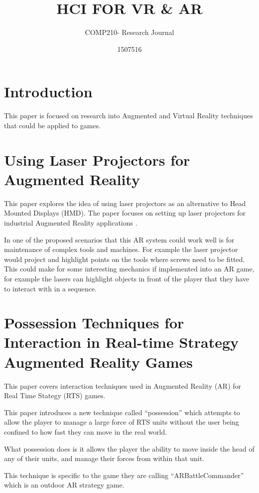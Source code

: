 \documentclass{scrartcl}
\title{HCI FOR VR \& AR}
\subtitle{COMP210- Research Journal}
\author{1507516}
\begin{document}
\maketitle

\abstract{}


\section{Introduction}
This paper is focused on research into Augmented and Virtual Reality techniques that could be applied to games.

\cite{nielsen1990heuristic}

\section {Using Laser Projectors for Augmented Reality\cite{Schwerdtfeger:2008}}

This paper explores the idea of using laser projectors as an alternative to Head Mounted Displays (HMD).
The paper focuses on setting up laser projectors for industrial Augmented Reality applications \cite{Schwerdtfeger:2008}.

In one of the proposed scenarios that this AR system could work well is for maintenance of complex tools and machines. For example the laser projector would project and highlight points on the tools where screws need to be fitted. This could make for some interesting mechanics if implemented into an AR game, for example the lasers can highlight objects in front of the player that they have to interact with in a sequence.

\section {Possession Techniques for Interaction in Real-time Strategy Augmented Reality Games \cite{Phillips:2005}}
This paper covers interaction techniques used in Augmented Reality (AR) for Real Time Stategy (RTS) games.

This paper introduces a new technique called ``possession'' which attempts to allow the player to manage a large force of RTS units without the user being confined to how fast they can move in the real world.

What possession does is it allows the player the ability to move inside the head of any of their units,  and manage their forces from within that unit. 

This technique is specific to the game they are calling ``ARBattleCommander'' which is an outdoor AR strategy game.
\end{document}
